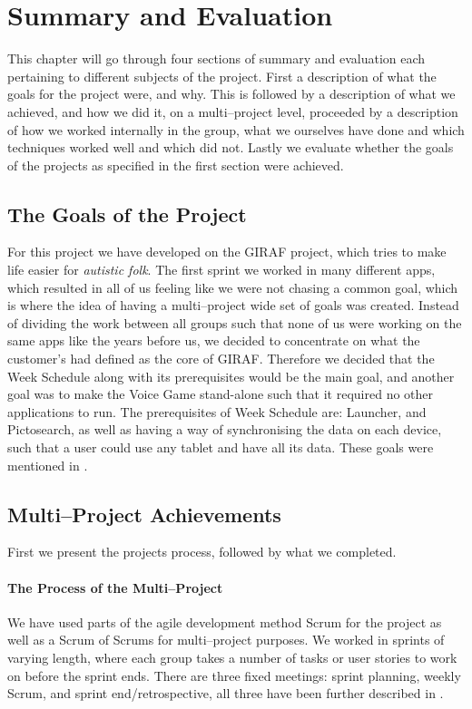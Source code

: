 \chapter{Summary and Evaluation}
This chapter will go through four sections of summary and evaluation each pertaining to different subjects of the project.
First a description of what the goals for the project were, and why.
This is followed by a description of what we achieved, and how we did it, on a multi--project level, proceeded by a description of how we worked internally in the group, what we ourselves have done and which techniques worked well and which did not.
Lastly we evaluate whether the goals of the projects as specified in the first section were achieved.

\section{The Goals of the Project}

For this project we have developed on the GIRAF project, which tries to make life easier for \textit{autistic folk}.
The first sprint we worked in many different apps, which resulted in all of us feeling like we were not chasing a common goal, which is where the idea of having a multi--project wide set of goals was created.
Instead of dividing the work between all groups such that none of us were working on the same apps like the years before us, we decided to concentrate on what the customer's had defined as the core of GIRAF.
Therefore we decided that the Week Schedule along with its prerequisites would be the main goal, and another goal was to make the Voice Game stand-alone such that it required no other applications to run.
The prerequisites of Week Schedule are: Launcher, and Pictosearch, as well as having a way of synchronising the data on each device, such that a user could use any tablet and have all its data.
These goals were mentioned in .

\section{Multi--Project Achievements}
First we present the projects process, followed by what we completed.

\subsubsection*{The Process of the Multi--Project}
We have used parts of the agile development method Scrum for the project as well as a Scrum of Scrums for multi--project purposes.
We worked in sprints of varying length, where each group takes a number of tasks or user stories to work on before the sprint ends.
There are three fixed meetings: sprint planning, weekly Scrum, and sprint end/retrospective, all three have been further described in .

